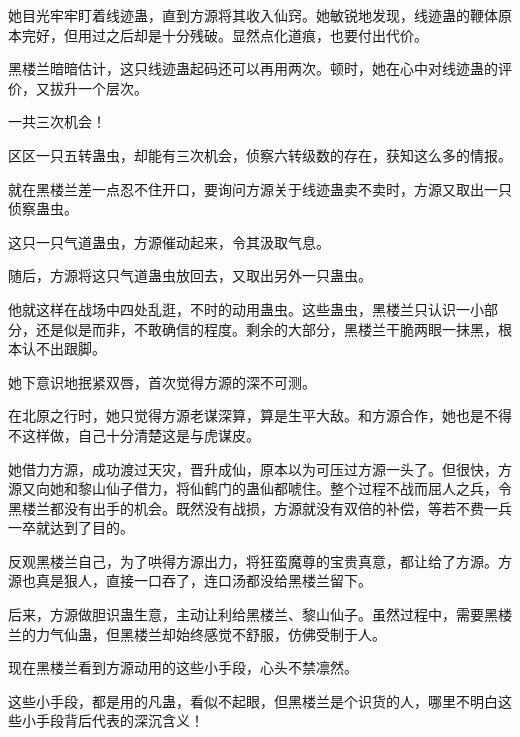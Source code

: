 \begin{this_body}
她目光牢牢盯着线迹蛊，直到方源将其收入仙窍。她敏锐地发现，线迹蛊的鞭体原本完好，但用过之后却是十分残破。显然点化道痕，也要付出代价。

黑楼兰暗暗估计，这只线迹蛊起码还可以再用两次。顿时，她在心中对线迹蛊的评价，又拔升一个层次。

一共三次机会！

区区一只五转蛊虫，却能有三次机会，侦察六转级数的存在，获知这么多的情报。

就在黑楼兰差一点忍不住开口，要询问方源关于线迹蛊卖不卖时，方源又取出一只侦察蛊虫。

这只一只气道蛊虫，方源催动起来，令其汲取气息。

随后，方源将这只气道蛊虫放回去，又取出另外一只蛊虫。

他就这样在战场中四处乱逛，不时的动用蛊虫。这些蛊虫，黑楼兰只认识一小部分，还是似是而非，不敢确信的程度。剩余的大部分，黑楼兰干脆两眼一抹黑，根本认不出跟脚。

她下意识地抿紧双唇，首次觉得方源的深不可测。

在北原之行时，她只觉得方源老谋深算，算是生平大敌。和方源合作，她也是不得不这样做，自己十分清楚这是与虎谋皮。

她借力方源，成功渡过天灾，晋升成仙，原本以为可压过方源一头了。但很快，方源又向她和黎山仙子借力，将仙鹤门的蛊仙都唬住。整个过程不战而屈人之兵，令黑楼兰都没有出手的机会。既然没有战损，方源就没有双倍的补偿，等若不费一兵一卒就达到了目的。

反观黑楼兰自己，为了哄得方源出力，将狂蛮魔尊的宝贵真意，都让给了方源。方源也真是狠人，直接一口吞了，连口汤都没给黑楼兰留下。

后来，方源做胆识蛊生意，主动让利给黑楼兰、黎山仙子。虽然过程中，需要黑楼兰的力气仙蛊，但黑楼兰却始终感觉不舒服，仿佛受制于人。

现在黑楼兰看到方源动用的这些小手段，心头不禁凛然。

这些小手段，都是用的凡蛊，看似不起眼，但黑楼兰是个识货的人，哪里不明白这些小手段背后代表的深沉含义！

\end{this_body}

